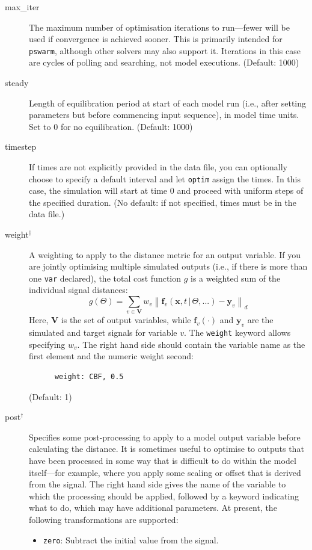 \documentclass[a4paper,11pt]{article}
\newcommand{\vv}[1]{\mathbf{#1}}
\begin{document}
\begin{adjustwidth}{0.8cm}{0.8cm}
\begin{description}
\item[max\_iter] The maximum number of optimisation iterations to run---fewer will be used if convergence is achieved sooner. This is primarily intended for \texttt{pswarm}, although other solvers may also support it. Iterations in this case are cycles of polling and searching, not model executions. (Default: 1000)
\item[steady] Length of equilibration period at start of each model run (i.e., after setting parameters but before commencing input sequence), in model time units. Set to 0 for no equilibration. (Default: 1000)
\item[timestep] If times are not explicitly provided in the data file, you can optionally choose to specify a default interval and let \texttt{optim} assign the times. In this case, the simulation will start at time 0 and proceed with uniform steps of the specified duration. (No default: if not specified, times must be in the data file.)
\item[weight$^{\dagger}$] A weighting to apply to the distance metric for an output variable. If you are jointly optimising multiple simulated outputs (i.e., if there is more than one \texttt{var} declared), the total cost function $g$ is a weighted sum of the individual signal distances:
$$
	g(\Theta) =  \sum_{v \in \vv{V}} w_v \left\| \vv{f}_v(\vv{x}, t \, | \, \Theta,...) - \vv{y}_v \right\|_{d}
$$
Here, $\vv{V}$ is the set of output variables, while $\vv{f}_v(\cdot)$ and $\vv{y}_v$ are the simulated and target signals for variable $v$. The \texttt{weight} keyword allows specifying $w_v$. The right hand side should contain the variable name as the first element and the numeric weight second:
\begin{verbatim}
      weight: CBF, 0.5
\end{verbatim}
(Default: 1)
\item[post$^{\dagger}$] Specifies some post-processing to apply to a model output variable before calculating the distance. It is sometimes useful to optimise to outputs that have been processed in some way that is difficult to do within the model itself---for example, where you apply some scaling or offset that is derived from the signal. The right hand side gives the name of the variable to which the processing should be applied, followed by a keyword indicating what to do, which may have additional parameters. At present, the following transformations are supported:
	\begin{itemize}
	\item \texttt{zero}: Subtract the initial value from the signal.

\end{itemize}
\end{description}
\end{adjustwidth}
\end{document}
